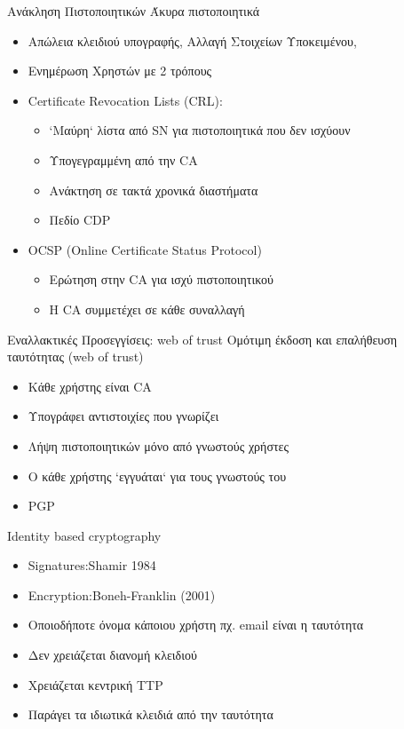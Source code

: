 \documentclass[handout]{beamer}
\begin{document}
\begin{frame}{Ανάκληση Πιστοποιητικών}
Άκυρα πιστοποιητικά
\begin{itemize}
\item Απώλεια κλειδιού υπογραφής, Αλλαγή Στοιχείων Υποκειμένου, 
\pause
\item Ενημέρωση Χρηστών με 2 τρόπους
\pause
\item Certificate Revocation Lists (CRL): 
\begin{itemize}
    \item `Μαύρη` λίστα από SN για πιστοποιητικά που δεν ισχύουν
    \item Υπογεγραμμένη από την CA
    \item Ανάκτηση σε τακτά χρονικά διαστήματα
    \item Πεδίο CDP 
\end{itemize}
\pause
\item OCSP (Online Certificate Status Protocol)
\begin{itemize}
    \item Ερώτηση στην CA για ισχύ πιστοποιητικού
    \item H CA συμμετέχει σε κάθε συναλλαγή
\end{itemize}
\end{itemize}
\end{frame}

\begin{frame}{Εναλλακτικές Προσεγγίσεις: web of trust}
Ομότιμη έκδοση και επαλήθευση ταυτότητας (web of trust)
\begin{itemize}
    \item Κάθε χρήστης είναι CA \pause
    \item Υπογράφει αντιστοιχίες που γνωρίζει \pause
    \item Λήψη πιστοποιητικών μόνο από γνωστούς χρήστες \pause
    \item O κάθε χρήστης `εγγυάται` για τους γνωστούς του \pause
    \item PGP
\end{itemize}
\end{frame}

\begin{frame}{Identity based cryptography}
\begin{itemize}
    \item Signatures:Shamir 1984 \pause
    \item Encryption:Boneh-Franklin (2001) \pause
    \item Οποιοδήποτε όνομα κάποιου χρήστη πχ. email είναι η ταυτότητα \pause
    \item Δεν χρειάζεται διανομή κλειδιού \pause
    \item Χρειάζεται κεντρική TTP \pause
    \item Παράγει τα ιδιωτικά κλειδιά από την ταυτότητα \pause
\end{itemize}
\end{frame}
\end{document}
